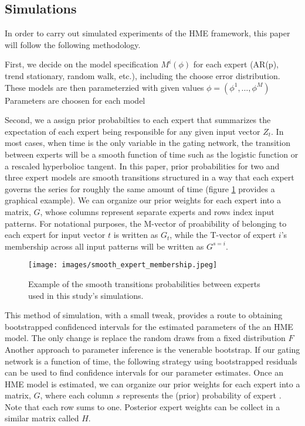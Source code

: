 \documentclass[12pt]{article}
\begin{document}
\subsection{Simulations}
In order to carry out simulated experiments of the HME framework, this paper will 
follow the following methodology.

First, we decide on the model specification $M^{i}(\phi)$ for each expert (AR(p),
trend stationary, random walk, etc.), including the choose error distribution.
These models are then parameterzied with given values $\phi=(\phi^{1},\dots,\phi^{M})$
Parameters are choosen for each model

Second, we a assign prior probabilties to each expert that summarizes the
expectation of each expert being responsible for any given input vector $Z_{t}$.
In most cases, when time is the only variable in the gating network, the
transition between experts will be a smooth function of time such as the
logistic function or a rescaled hyperbolioc tangent. In this paper, prior
probabilities for two and three expert models are smooth transitions
structured in a way that each expert governs the series for roughly the same
amount of time (figure \ref{fig:expertmembership} provides a graphical example).
We can organize our prior weights for each expert into a matrix, $G$, whose
columns represent separate experts and rows index input patterns. For notational
purposes, the M-vector of proabibility of belonging to each expert for input
vector $t$ is written as $G_{t}$, while the T-vector of expert $i$'s membership
across all input patterns will be written as $G^{s=i}$.

\begin{figure}[ht]
  \centering
  \texttt{[image: images/smooth\_expert\_membership.jpeg]}
  \caption{Example of the smooth transitions probabilities between experts used in this study's simulations.}
  \label{fig:expertmembership}
\end{figure}

This method of simulation, with a small tweak, provides a route to obtaining bootstrapped confidenced intervals for the estimated parameters of the an HME model. The only change is replace the random draws from a fixed distribution $F$ Another approach to parameter inference is the venerable bootstrap. If our gating network is a function of time, the following strategy using bootstrapped residuals can be used to find confidence intervals for our parameter estimates. Once an HME model is estimated, we can organize our prior weights for each expert into a matrix, $G$, where each column $s$ represents the (prior) probability of expert . Note that each row sums to one. Posterior expert weights can be collect in a similar matrix called $H$.
\end{document}
